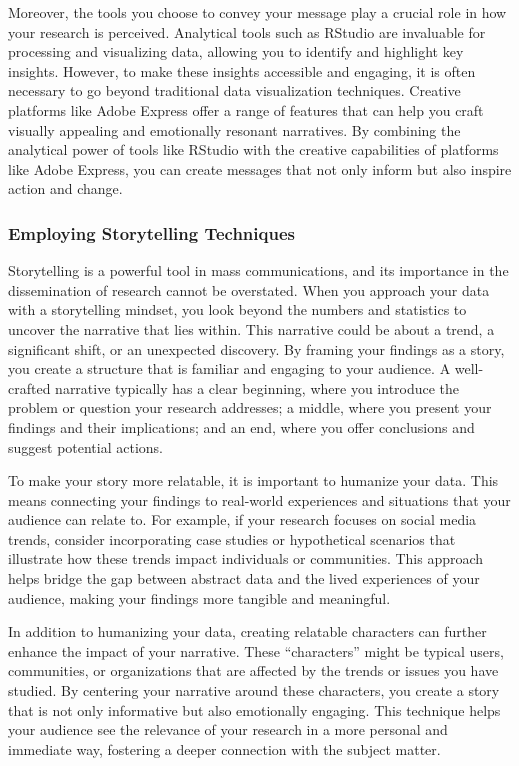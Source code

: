 \documentclass[
]{book}
\begin{document}
Moreover, the tools you choose to convey your message play a crucial role in how your research is perceived. Analytical tools such as RStudio are invaluable for processing and visualizing data, allowing you to identify and highlight key insights. However, to make these insights accessible and engaging, it is often necessary to go beyond traditional data visualization techniques. Creative platforms like Adobe Express offer a range of features that can help you craft visually appealing and emotionally resonant narratives. By combining the analytical power of tools like RStudio with the creative capabilities of platforms like Adobe Express, you can create messages that not only inform but also inspire action and change.

\subsubsection*{Employing Storytelling Techniques}\label{employing-storytelling-techniques}

Storytelling is a powerful tool in mass communications, and its importance in the dissemination of research cannot be overstated. When you approach your data with a storytelling mindset, you look beyond the numbers and statistics to uncover the narrative that lies within. This narrative could be about a trend, a significant shift, or an unexpected discovery. By framing your findings as a story, you create a structure that is familiar and engaging to your audience. A well-crafted narrative typically has a clear beginning, where you introduce the problem or question your research addresses; a middle, where you present your findings and their implications; and an end, where you offer conclusions and suggest potential actions.

To make your story more relatable, it is important to humanize your data. This means connecting your findings to real-world experiences and situations that your audience can relate to. For example, if your research focuses on social media trends, consider incorporating case studies or hypothetical scenarios that illustrate how these trends impact individuals or communities. This approach helps bridge the gap between abstract data and the lived experiences of your audience, making your findings more tangible and meaningful.

In addition to humanizing your data, creating relatable characters can further enhance the impact of your narrative. These ``characters'' might be typical users, communities, or organizations that are affected by the trends or issues you have studied. By centering your narrative around these characters, you create a story that is not only informative but also emotionally engaging. This technique helps your audience see the relevance of your research in a more personal and immediate way, fostering a deeper connection with the subject matter.
\end{document}
